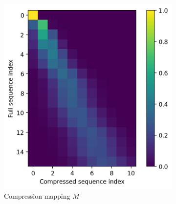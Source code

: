 \begin{figure}[!ht]
    \centering
    \begin{subfigure}[b]{0.48\columnwidth}
         \includegraphics[width=\linewidth]{sources/part_2/kv_cache/imgs/compression_map_ex.png}
         \caption{Compression mapping $M$}
    \end{subfigure}
    \begin{subfigure}[b]{0.39\columnwidth}

\end{subfigure}
\end{figure}
